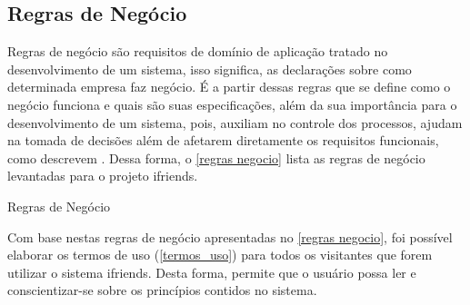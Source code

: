 \subsection{Regras de Negócio}
Regras de negócio são requisitos de domínio de aplicação tratado no desenvolvimento de um sistema, isso significa, as declarações sobre como determinada empresa faz negócio. É a partir dessas regras que se define como o negócio funciona e quais são suas especificações, além da sua importância para o desenvolvimento de um sistema, pois, auxiliam no controle dos processos, ajudam na tomada de decisões além de afetarem diretamente os requisitos funcionais, como descrevem . Dessa forma, o \autoref{regras negocio} lista as regras de negócio levantadas para o projeto \gls{ifriends}.

\def\arraystretch{2}
\begin{quadro}[thb]
\centering
\ABNTEXfontereduzida
\caption{Regras de Negócio}
\label{regras negocio}
\end{quadro}
\FloatBarrier 

Com base nestas regras de negócio apresentadas no \autoref{regras negocio},  foi possível elaborar os termos de uso (\autoref{termos_uso}) para todos os visitantes que forem utilizar o sistema \gls{ifriends}. Desta forma, permite que o usuário possa ler e conscientizar-se sobre os princípios contidos no sistema.

